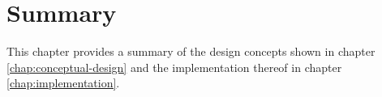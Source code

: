 \chapter{Summary}
\label{chap:summary}
This chapter provides a summary of the design concepts shown in chapter \ref{chap:conceptual-design} and the implementation thereof in chapter \ref{chap:implementation}.


